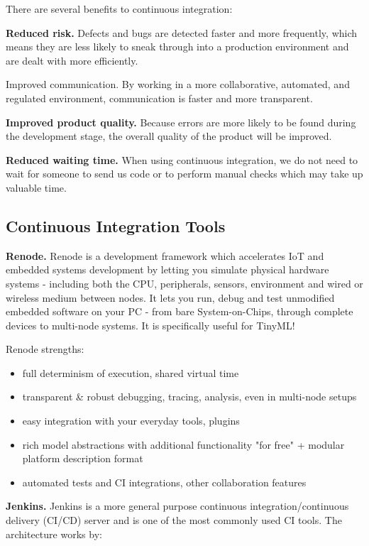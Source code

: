 {{{{    There are several benefits to continuous integration:
    
    \textbf{Reduced risk.} Defects and bugs are detected faster and more frequently, which means they are less likely to sneak through into a production environment and are dealt with more efficiently.
    
    Improved communication. By working in a more collaborative, automated, and regulated environment, communication is faster and more transparent.
    
    \textbf{Improved product quality.} Because errors are more likely to be found during the development stage, the overall quality of the product will be improved.
    
    \textbf{Reduced waiting time.} When using continuous integration, we do not need to wait for someone to send us code or to perform manual checks which may take up valuable time.
    
    \subsection{Continuous Integration Tools}
    
    \textbf{Renode.} Renode is a development framework which accelerates IoT and embedded systems development by letting you simulate physical hardware systems - including both the CPU, peripherals, sensors, environment and wired or wireless medium between nodes. It lets you run, debug and test unmodified embedded software on your PC - from bare System-on-Chips, through complete devices to multi-node systems. It is specifically useful for TinyML! 
    
    Renode strengths:
    
    \begin{itemize}
      \item full determinism of execution, shared virtual time
      \item transparent \& robust debugging, tracing, analysis, even in multi-node setups
      \item easy integration with your everyday tools, plugins
      \item rich model abstractions with additional functionality "for free" + modular platform description format
      \item automated tests and CI integrations, other collaboration features
    \end{itemize}
    
    \textbf{Jenkins.} Jenkins is a more general purpose continuous integration/continuous delivery (CI/CD) server and is one of the most commonly used CI tools. The architecture works by:
    
}}}}
